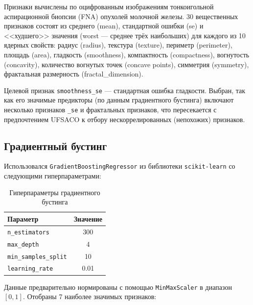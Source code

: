 Признаки вычислены по оцифрованным изображениям тонкоигольной аспирационной биопсии (FNA) опухолей молочной железы. 30 вещественных признаков состоят из среднего (mean), стандартной ошибки (se) и <<худшего>> значения (worst --- среднее трёх наибольших) для каждого из 10 ядерных свойств: радиус (radius), текстура (texture), периметр (perimeter), площадь (area), гладкость (smoothness), компактность (compactness), вогнутость (concavity), количество вогнутых точек (concave points), симметрия (symmetry), фрактальная размерность (fractal\_dimension).

Целевой признак \texttt{smoothness\_se} --- стандартная ошибка гладкости. Выбран, так как его значимые предикторы (по данным градиентного бустинга) включают несколько признаков \texttt{\_se} и фрактальных признаков, что пересекается с предпочтением UFSACO к отбору нескоррелированных (непохожих) признаков.

\subsection{Градиентный бустинг}

Использовался \texttt{GradientBoostingRegressor} из библиотеки \texttt{scikit-learn} со следующими гиперпараметрами:

\begin{table}[H]
    \centering
    \caption{Гиперпараметры градиентного бустинга}
    \label{tab:gb_params}
    \begin{tabular}{|l|c|}
        \hline
        \textbf{Параметр} & \textbf{Значение} \\
        \hline
        \texttt{n\_estimators} & 300 \\
        \texttt{max\_depth} & 4 \\
        \texttt{min\_samples\_split} & 10 \\
        \texttt{learning\_rate} & 0.01 \\
        \hline
    \end{tabular}
\end{table}

Данные предварительно нормированы с помощью \texttt{MinMaxScaler} в диапазон $[0, 1]$. Отобраны 7 наиболее значимых признаков:

